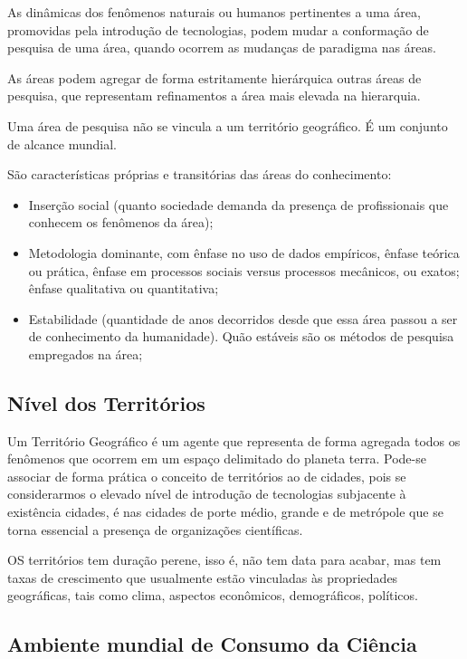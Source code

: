 As dinâmicas dos fenômenos naturais ou humanos pertinentes a uma área, promovidas pela introdução de tecnologias, podem mudar a conformação de pesquisa de uma área, quando ocorrem as mudanças de paradigma nas áreas.

As áreas podem agregar de forma estritamente hierárquica outras áreas de pesquisa, que representam refinamentos a área mais elevada na hierarquia.

Uma área de pesquisa não se vincula a um território geográfico. É um conjunto de alcance mundial.

São características próprias e transitórias das áreas do conhecimento:
    \begin{itemize}
        \item Inserção social (quanto  sociedade demanda da presença de profissionais que conhecem os fenômenos da área);
        \item Metodologia dominante, com ênfase no uso de dados empíricos, ênfase teórica ou prática, ênfase em processos sociais versus processos mecânicos, ou exatos; ênfase qualitativa ou quantitativa;
        \item Estabilidade (quantidade de anos decorridos desde que essa área passou a ser de conhecimento da humanidade). Quão estáveis são os métodos de pesquisa empregados na área;
    \end{itemize}

\subsection{Nível dos Territórios}

Um Território Geográfico é um agente que representa de forma agregada todos os fenômenos que ocorrem em um espaço delimitado do planeta terra.
Pode-se associar de forma prática o conceito de territórios ao de cidades, pois se considerarmos o elevado nível de introdução de tecnologias subjacente à existência cidades, é nas cidades de porte médio, grande e de metrópole que se torna essencial a presença de organizações científicas.

OS territórios tem duração perene, isso é, não tem data para acabar, mas tem taxas de crescimento que usualmente estão vinculadas às propriedades geográficas, tais como clima, aspectos econômicos, demográficos, políticos.

\subsection{Ambiente mundial de Consumo da Ciência}
    
